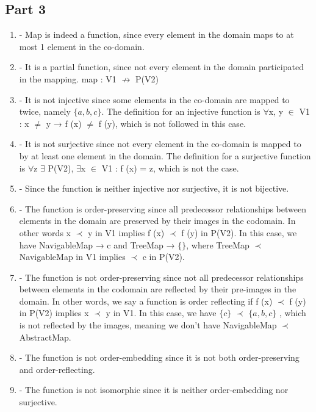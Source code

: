 \documentclass[12pt]{article}
\begin{document}
\subsection*{Part 3}
\begin{enumerate}
	\item - Map is indeed a function, since every element in the domain maps to at most 1 element in the co-domain.
	
	\item - It is a partial function, since not every element in the domain participated in the mapping. 		map : V1 $\not\rightarrow$ P(V2)
	
	\item - It is not injective since some elements in the co-domain are mapped to twice, namely $\{a ,b ,c\}$. The definition for an injective function is $\forall$x, y $\in$ V1 : x $\neq$ y → f (x) $\neq$ f (y), which is not followed in this case.
	
	\item - It is not surjective since not every element in the co-domain is mapped to by at least one element in the domain. The definition for a surjective function is $\forall$z $\exists$ P(V2), $\exists$x $\in$ V1 : f (x) = z, which is not the case.
	
	\item - Since the function is neither injective nor surjective, it is not bijective.
	
	\item -  The function is order-preserving since all predecessor relationships between elements in the domain are preserved by their images in the codomain. In other words 
	x $\prec$ y in V1 implies f (x) $\prec$ f (y) in P(V2). In this case, we have NavigableMap → {c} and TreeMap → $\{\}$, where TreeMap $\prec$ NavigableMap in V1 implies {} $\prec$ {c} in P(V2).
	
	\item - The function is not order-preserving since not all predecessor relationships between elements in the codomain are reflected by their pre-images in the domain. In other words, we say a function is order reflecting if f (x) $\prec$ f (y) in P(V2) implies x $\prec$ y in V1. In this case, we have $\{c\}$ $\prec$ $\{a,b,c\}$ , which is not reflected by the images, meaning we don’t have NavigableMap $\prec$ AbstractMap.
	
	\item - The function is not order-embedding since it is not both order-preserving and order-reflecting.
	
	\item -  The function is not isomorphic since it is neither order-embedding nor surjective.
\end{enumerate}
\end{document}
